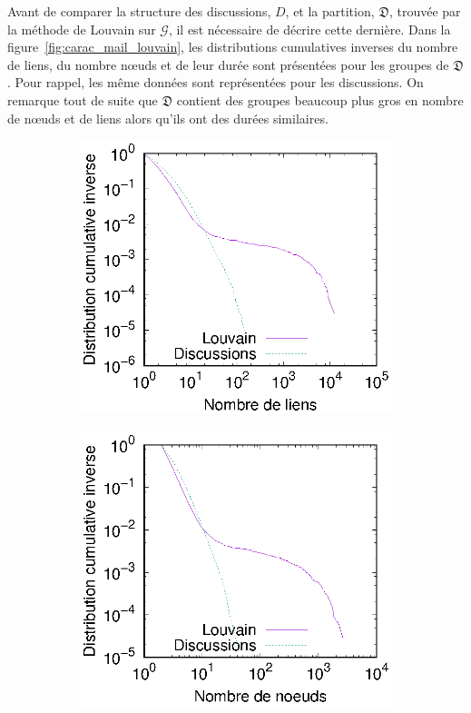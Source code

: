 Avant de comparer la structure des discussions, $D$, et la partition, $\mathfrak{D}$, trouvée par la méthode de Louvain sur $\mathcal{G}$, il est nécessaire de décrire cette dernière.
Dans la figure~\ref{fig:carac_mail_louvain}, les distributions cumulatives inverses du nombre de liens, du nombre n\oe{}uds et de leur durée sont présentées pour les groupes de $\mathfrak{D}$.
Pour rappel, les même données sont représentées pour les discussions.
On remarque tout de suite que $\mathfrak{D}$ contient des groupes beaucoup plus gros en nombre de n\oe{}uds et de liens alors qu'ils ont des durées similaires.
\begin{figure}[h]
\centering
	\begin{subfigure}{0.4\textwidth}
		\includegraphics[width=\linewidth]{img/mailing/Detection/linksize}\hfill
		\caption{}		
	\end{subfigure}
	\begin{subfigure}{0.4\textwidth}
		\includegraphics[width=\linewidth]{img/mailing/Detection/nodeSize}\hfill
		\caption{}		
	\end{subfigure}


\end{figure}
